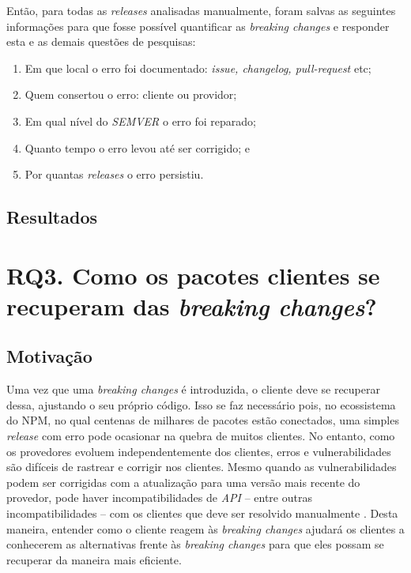 Então, para todas as \textit{releases} analisadas manualmente, foram salvas as seguintes informações para que fosse possível quantificar as \textit{breaking changes} e responder esta e as demais questões de pesquisas:

\begin{enumerate}
    \item Em que local o erro foi documentado: \textit{issue, changelog, pull-request} etc;
    \item Quem consertou o erro: cliente ou providor;
    \item Em qual nível do \textit{SEMVER} o erro foi reparado;
    \item Quanto tempo o erro levou até ser corrigido; e
    \item Por quantas \textit{releases} o erro persistiu.
\end{enumerate}{}


\subsection{Resultados}
\label{fin:rq2}

\section{RQ3. Como os pacotes clientes se recuperam das \textit{breaking changes}?}
\label{sec:rq3}

\subsection{Motivação}
\label{mot:rq3}
Uma vez que uma \textit{breaking changes} é introduzida, o cliente deve se recuperar dessa, ajustando o seu próprio código. Isso se faz necessário pois, no ecossistema do  \gls{NPM}, no qual centenas de milhares de pacotes estão conectados, uma simples \textit{release} com erro pode ocasionar na quebra de muitos clientes. No entanto, como os provedores evoluem independentemente dos clientes, erros e vulnerabilidades são difíceis de rastrear e corrigir nos clientes. Mesmo quando as vulnerabilidades podem ser corrigidas com a atualização para uma versão mais recente do provedor, pode haver incompatibilidades de \textit{API} -- entre outras incompatibilidades -- com os clientes que deve ser resolvido manualmente \cite{Foo:2018:ESC:3236024.3275535}. Desta maneira, entender como o cliente reagem às \textit{breaking changes} ajudará os clientes a conhecerem as alternativas frente às \textit{breaking changes} para que eles possam se recuperar da maneira mais eficiente.


